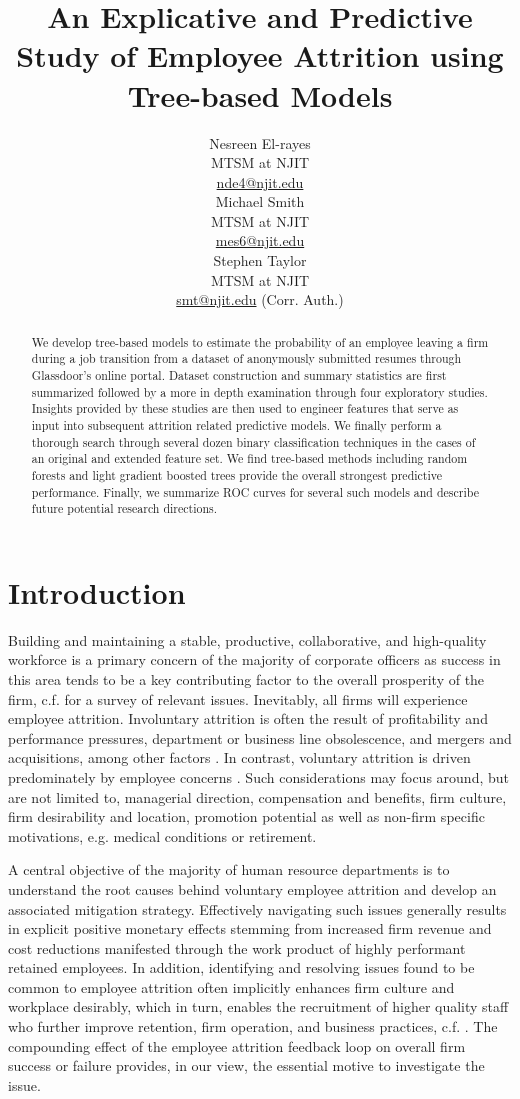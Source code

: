 \documentclass[10pt]{article}
\title{An Explicative and Predictive Study of Employee Attrition using Tree-based Models}
\author{Nesreen El-rayes\\
  MTSM at NJIT \\
  {\underline{nde4@njit.edu}} \\\And
  Michael Smith\\
  MTSM at NJIT \\
  {\underline{mes6@njit.edu}}\\\And 
  Stephen Taylor\\
  MTSM at NJIT \\
  {\underline{smt@njit.edu} (Corr. Auth.)} \\}
\date{}
\begin{document}
\maketitle
\begin{abstract}
We develop tree-based models to estimate the probability of an employee leaving a 
firm during a job transition from a dataset of anonymously submitted resumes 
through Glassdoor's online portal.  Dataset  construction and summary 
statistics are first summarized followed by a more in depth examination  
through four exploratory studies.  Insights provided by these studies are then 
used to engineer features that serve as input into subsequent attrition related 
predictive models.  We finally perform a thorough search through several dozen binary 
classification techniques in the cases of an original and extended feature set.  
We find tree-based methods including random forests and light gradient boosted trees 
provide the overall strongest predictive performance.  Finally, we summarize ROC curves 
for several such models and describe future potential research directions. 
\end{abstract}

\section{Introduction}
\hspace{\parindent}
Building and maintaining a stable, productive, collaborative, and high-quality workforce is a primary concern 
of the majority of corporate officers as success in this area tends to be a key contributing factor to the 
overall prosperity of the firm, c.f. \cite{Mir1993} for a survey of relevant issues.
Inevitably, all firms will experience employee attrition.  
Involuntary attrition is often the result of profitability and performance pressures, department or business 
line obsolescence, and mergers and acquisitions, among other factors \cite{Datta2009,Grip2006,SHAU1998}.  In contrast,
voluntary attrition is driven predominately by employee concerns \cite{Singh2012}.  Such considerations 
may focus around, but are not limited to, managerial direction, compensation and benefits, firm culture, 
firm desirability and location, promotion potential as well as non-firm specific motivations, e.g. medical 
conditions or retirement. 
  
A central objective of the majority of human resource departments is to understand the root causes 
behind voluntary employee attrition and develop an associated mitigation strategy.  Effectively 
navigating such issues generally results in explicit positive monetary effects stemming from increased 
firm revenue and cost reductions manifested through the work product of highly performant retained employees. 
In addition, identifying and resolving issues found to be common to employee attrition often implicitly 
enhances firm culture and workplace desirably, which in turn, enables the recruitment of higher quality 
staff who further improve retention, firm operation, and business practices, c.f.  \cite{Cook1986,Free1994}.  
The compounding effect of the employee attrition feedback loop on overall firm
success or failure provides, in our view, the essential motive to 
investigate the issue. 
\end{document}
